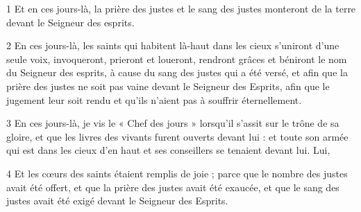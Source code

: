 \par 1 Et en ces jours-là, la prière des justes et le sang des justes monteront de la terre devant le Seigneur des esprits.
\par 2 En ces jours-là, les saints qui habitent là-haut dans les cieux s'uniront d'une seule voix, invoqueront, prieront et loueront, rendront grâces et béniront le nom du Seigneur des esprits, à cause du sang des justes qui a été versé, et afin que la prière des justes ne soit pas vaine devant le Seigneur des Esprits, afin que le jugement leur soit rendu et qu'ils n'aient pas à souffrir éternellement.
\par 3 En ces jours-là, je vis le « Chef des jours » lorsqu'il s'assit sur le trône de sa gloire, et que les livres des vivants furent ouverts devant lui : et toute son armée qui est dans les cieux d'en haut et ses conseillers se tenaient devant lui. Lui,
\par 4 Et les cœurs des saints étaient remplis de joie ; parce que le nombre des justes avait été offert, et que la prière des justes avait été exaucée, et que le sang des justes avait été exigé devant le Seigneur des Esprits.


